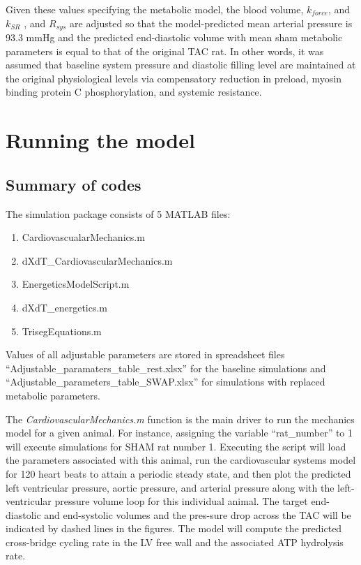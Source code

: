 \documentclass[fleqn,10pt]{physiome}
\begin{document}
Given these values specifying the metabolic model, the blood volume, $k_{force}$, and $k_{SR}$ , and $R_{sys}$ are adjusted so that the model-predicted mean arterial pressure is 93.3 mmHg and the predicted end-diastolic volume with mean sham metabolic parameters is equal to that of the original TAC rat. In other words, it was assumed that baseline system pressure and diastolic filling level are maintained at the original physiological levels via compensatory reduction in preload, myosin binding protein C phosphorylation, and systemic resistance. 

\section{Running the model}

\subsection{Summary of codes}

The simulation package consists of 5 MATLAB files:
\begin{enumerate}
    \item CardiovascualarMechanics.m
    \item dXdT\_CardiovascularMechanics.m
    \item EnergeticsModelScript.m
    \item dXdT\_energetics.m
    \item TrisegEquations.m
\end{enumerate}

Values of all adjustable parameters are stored in spreadsheet files ``Adjustable\_paramaters\_table\_rest.xlsx'' for the baseline simulations and ``Adjustable\_parameters\_table\_SWAP.xlsx'' for simulations with replaced metabolic parameters.

The {\em CardiovascularMechanics.m} function is the main driver to run the mechanics model for a given animal. For instance, assigning the variable ``rat\_number'' to 1 will execute simulations for SHAM rat number 1. Executing the script will load the parameters associated with this animal, run the cardiovascular systems model for 120 heart beats to attain a periodic steady state, and then plot the predicted left ventricular pressure, aortic pressure, and arterial pressure along with the left-ventricular pressure volume loop for this individual animal. The target end-diastolic and end-systolic volumes and the pres-sure drop across the TAC will be indicated by dashed lines in the figures. The model will compute the predicted cross-bridge cycling rate in the LV free wall and the associated ATP hydrolysis rate.
\end{document}
